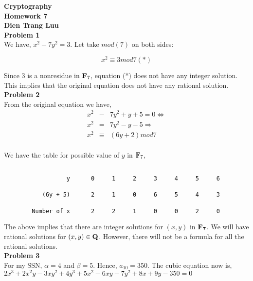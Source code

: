 


\noindent
{\bf
Cryptography\\
Homework 7\\
Dien Trang Luu}\\

\noindent
{\bf Problem 1}\\

We have, $x^2 - 7y^2 = 3$.
Let take $mod (7)$ on both sides:

\begin{displaymath}
x^2 \equiv 3 mod 7 (*)
\end{displaymath}

Since $3$ is a nonresidue in ${\bf F}_7$, equation (*) does
not have any integer solution. This implies that the original
equation does not have any rational solution.\\

\noindent
{\bf Problem 2}\\

From the original equation we have,
\begin{eqnarray*}
x^2 &-& 7y^2 + y + 5 = 0 \Leftrightarrow \\
x^2 &=& 7y^2 - y - 5 \Rightarrow \\
x^2 &\equiv& (6y + 2) mod 7 \\
\end{eqnarray*}

We have the table for possible value of $y$ in ${\bf F}_7$,\\

\begin{verbatim}
        
                  y      0     1     2     3     4     5     6
		  
           (6y + 5)      2     1     0     6     5     4     3
	
        Number of x      2     2     1     0     0     2     0     

\end{verbatim}

The above implies that there are integer solutions for $(x, y)$ in
$\bf{ F}_7$. We will have rational solutions for $(x, y)\in{\bf Q}$.
However, there will not be a formula for all the rational solutions.\\

\noindent
{\bf Problem 3}\\

For my SSN, $\alpha = 4$ and $\beta = 5$. Hence, $a_{10} = 350$. The cubic equation now is,
$2x^3 + 2x^2y - 3xy^2 + 4y^3 + 5x^2 - 6xy -7y^2 + 8x + 9y - 350 = 0$
\\

